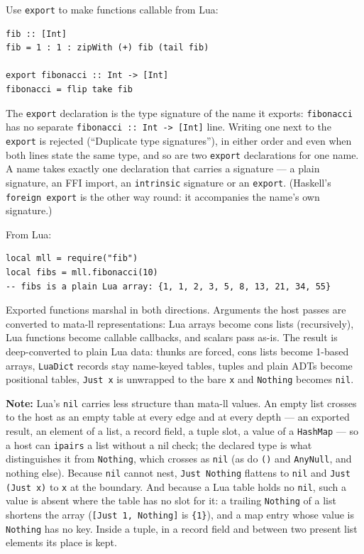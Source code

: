 \documentclass[11pt,a4paper]{article}
\newenvironment{note}{%
  \def\FrameCommand{\fboxsep=3mm \colorbox{notebg}}%
  \MakeFramed{\advance\hsize-\width \FrameRestore}%
  \noindent\textbf{Note:} }%
  {\endMakeFramed}
\begin{document}
Use \texttt{export} to make functions callable from Lua:

\begin{lstlisting}
fib :: [Int]
fib = 1 : 1 : zipWith (+) fib (tail fib)

export fibonacci :: Int -> [Int]
fibonacci = flip take fib
\end{lstlisting}

The \texttt{export} declaration is the type signature of the name it
exports: \texttt{fibonacci} has no separate
\texttt{fibonacci :: Int -> [Int]} line.  Writing one next to the
\texttt{export} is rejected (``Duplicate type signatures''), in either
order and even when both lines state the same type, and so are two
\texttt{export} declarations for one name.  A name takes exactly one
declaration that carries a signature --- a plain signature, an FFI
import, an \texttt{intrinsic} signature or an \texttt{export}.
(Haskell's \texttt{foreign export} is the other way round: it
accompanies the name's own signature.)

From Lua:
\begin{lstlisting}[language={}]
local mll = require("fib")
local fibs = mll.fibonacci(10)
-- fibs is a plain Lua array: {1, 1, 2, 3, 5, 8, 13, 21, 34, 55}
\end{lstlisting}

Exported functions marshal in both directions.  Arguments the host
passes are converted to mata-ll representations: Lua arrays become cons
lists (recursively), Lua functions become callable callbacks, and
scalars pass as-is.  The result is deep-converted to plain Lua data:
thunks are forced, cons lists become 1-based arrays, \texttt{LuaDict}
records stay name-keyed tables, tuples and plain ADTs become positional
tables, \texttt{Just x} is unwrapped to the bare \texttt{x} and
\texttt{Nothing} becomes \texttt{nil}.

\begin{note}
Lua's \texttt{nil} carries less structure than mata-ll values.  An
empty list crosses to the host as an empty table at every edge and at
every depth --- an exported result, an element of a list, a record
field, a tuple slot, a value of a \texttt{HashMap} --- so a host can
\texttt{ipairs} a list without a nil check; the declared type is what
distinguishes it from \texttt{Nothing}, which crosses as \texttt{nil}
(as do \texttt{()} and \texttt{AnyNull}, and nothing else).  Because
\texttt{nil} cannot nest, \texttt{Just Nothing} flattens to
\texttt{nil} and \texttt{Just (Just x)} to \texttt{x} at the boundary.
And because a Lua table holds no \texttt{nil}, such a value is absent
where the table has no slot for it: a trailing \texttt{Nothing} of a
list shortens the array (\texttt{[Just 1, Nothing]} is \texttt{\{1\}}),
and a map entry whose value is \texttt{Nothing} has no key.  Inside a
tuple, in a record field and between two present list elements its
place is kept.
\end{note}
\end{document}
